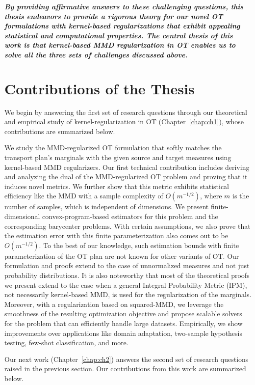 \textit{\textbf{By providing affirmative answers to these challenging questions,
this thesis endeavors to provide a rigorous theory for our novel OT formulations with kernel-based regularizations that exhibit appealing statistical and computational properties. The central thesis of this work is that kernel-based MMD regularization in OT enables us to solve all the three sets of challenges discussed above.}}

\section{Contributions of the Thesis}
We begin by answering the first set of research questions through our theoretical and empirical study of kernel-regularization in OT (Chapter~\ref{chap:ch1}), whose contributions are summarized below.

We study the MMD-regularized OT formulation that softly matches the transport plan’s marginals with the given source and target measures using kernel-based MMD regularizers.
Our first technical contribution includes deriving and analyzing the dual of the MMD-regularized OT problem and proving that it induces novel metrics. We further show that this metric exhibits statistical efficiency like the MMD with a sample complexity of $O(m^{-1/2})$, where $m$ is the number of samples, which is independent of dimensions. We present finite-dimensional convex-program-based estimators for this problem and the corresponding barycenter problems. With certain assumptions, we also prove that the estimation error with this finite parameterization also comes out to be $O(m^{-1/2})$. To the best of our knowledge, such estimation bounds with finite parameterization of the OT plan are not known for other variants of OT. Our formulation and proofs extend to the case of unnormalized measures and not just probability distributions. It is also noteworthy that most of the theoretical proofs we present extend to the case when a general Integral Probability Metric (IPM), not necessarily kernel-based MMD, is used for the regularization of the marginals. Moreover, with a regularization based on squared-MMD, we leverage the smoothness of the resulting optimization objective and propose scalable solvers for the problem that can efficiently handle large datasets. Empirically, we show improvements over applications like domain adaptation, two-sample hypothesis testing, few-shot classification, and more.

Our next work (Chapter~\ref{chap:ch2}) answers the second set of research questions raised in the previous section. Our contributions from this work are summarized below.


